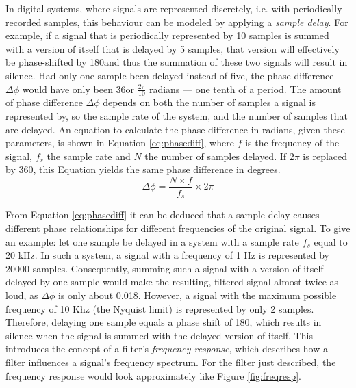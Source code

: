 \documentclass[12pt,twoside]{report}
\begin{document}
\noindent In digital systems, where signals are represented discretely, i.e. with periodically recorded samples, this behaviour can be modeled by applying a \emph{sample delay}.  For example, if a signal that is periodically represented by 10 samples is summed with a version of itself that is delayed by 5 samples, that version will effectively be phase-shifted by 180\degree and thus the summation of these two signals will result in silence. Had only one sample been delayed instead of five, the phase difference $\Delta \phi$ would have only been 36\degree or $\frac{2\pi}{10}$ radians --- one tenth of a period. The amount of phase difference $\Delta \phi$ depends on both the number of samples a signal is represented by, so the sample rate of the system, and the number of samples that are delayed. An equation to calculate the phase difference in radians, given these parameters, is shown in Equation \ref{eq:phasediff}, where $f$ is the frequency of the signal, $f_{s}$ the sample rate and $N$ the number of samples delayed. If $2\pi$ is replaced by 360, this Equation yields the same phase difference in degrees.\\

\begin{equation}
  \Delta\phi = \frac{N \times f}{f_{s}} \times 2\pi
  \label{eq:phasediff}
\end{equation}

\noindent From Equation \ref{eq:phasediff} it can be deduced that a sample delay causes different phase relationships for different frequencies of the original signal. To give an example: let one sample be delayed in a system with a sample rate $f_{s}$ equal to 20 kHz. In such a system, a signal with a frequency of 1 Hz is represented by 20000 samples. Consequently, summing such a signal with a version of itself delayed by one sample would make the resulting, filtered signal almost twice as loud, as $\Delta\phi$ is only about 0.018\degree. However, a signal with the maximum possible frequency of 10 Khz (the Nyquist limit) is represented by only 2 samples. Therefore, delaying one sample equals a phase shift of 180\degree, which results in silence when the signal is summed with the delayed version of itself. This introduces the concept of a filter's \emph{frequency response}, which describes how a filter influences a signal's frequency spectrum. For the filter just described, the frequency response would look approximately like Figure \ref{fig:freqresp}.\\
\end{document}
